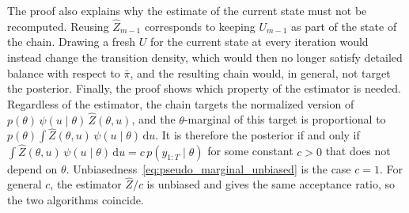 The proof also explains why the estimate of the current state must not be recomputed. Reusing $\hat{Z}_{m-1}$ corresponds to keeping $U_{m-1}$ as part of the state of the chain. Drawing a fresh $U$ for the current state at every iteration would instead change the transition density, which would then no longer satisfy detailed balance with respect to $\bar{\pi}$, and the resulting chain would, in general, not target the posterior. 
Finally, the proof shows which property of the estimator is needed. Regardless of the estimator, the chain targets the normalized version of $p(\theta)\,\psi(u\mid\theta)\,\hat{Z}(\theta,u)$, and the $\theta$-marginal of this target is proportional to $p(\theta)\int\hat{Z}(\theta,u)\,\psi(u\mid\theta)\,\mathrm{d}u$.
It is therefore the posterior if and only if $\int\hat{Z}(\theta,u)\,\psi(u\mid\theta)\,\mathrm{d}u = c\,p(y_{1:T}\mid\theta)$ for some constant $c>0$ that does not depend on $\theta$.
Unbiasedness~\eqref{eq:pseudo_marginal_unbiased} is the case $c=1$. For general $c$, the estimator $\hat{Z}/c$ is unbiased and gives the same acceptance ratio, so the two algorithms coincide.

